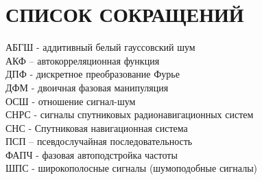\section*{СПИСОК СОКРАЩЕНИЙ}
АБГШ - аддитивный белый гауссовский шум				\\
АКФ – автокорреляционная функция				\\
ДПФ - дискретное преобразование Фурье				\\
ДФМ - двоичная фазовая манипуляция				\\
ОСШ - отношение сигнал-шум 					\\
СНРС - сигналы спутниковых радионавигационных систем		\\
СНС - Спутниковая навигационная система				\\
ПСП – псевдослучайная последовательность			\\
ФАПЧ - фазовая автоподстройка частоты				\\
ШПС -  широкополосные сигналы (шумоподобные сигналы)		\\
\newpage
